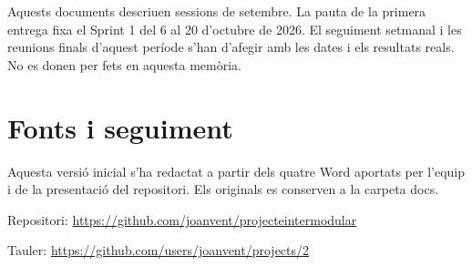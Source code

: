 \documentclass[11pt,a4paper]{report}
\begin{document}
Aquests documents descriuen sessions de setembre. La pauta de la primera entrega fixa el Sprint 1 del 6 al 20 d'octubre de 2026. El seguiment setmanal i les reunions finals d'aquest període s'han d'afegir amb les dates i els resultats reals. No es donen per fets en aquesta memòria.
\section{Fonts i seguiment}
Aquesta versió inicial s'ha redactat a partir dels quatre Word aportats per l'equip i de la presentació del repositori. Els originals es conserven a la carpeta docs.

Repositori: \url{https://github.com/joanvent/projecteintermodular}

Tauler: \url{https://github.com/users/joanvent/projects/2}
\end{document}

